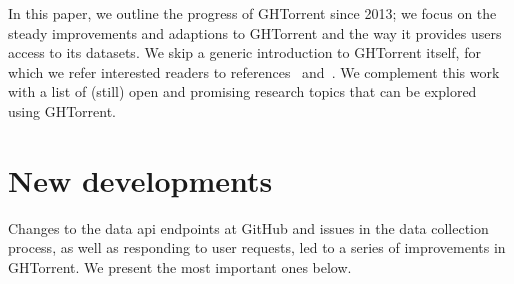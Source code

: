 \documentclass{sig-alternate}
\begin{document}
In this paper, we outline the progress of GHTorrent since 2013; we focus on the
steady improvements and adaptions to GHTorrent and the way it provides users
access to its datasets. We skip a generic introduction to GHTorrent itself, for
which we refer interested readers to references~\cite{GS12} and~\cite{Gousi13}.
We complement this work with a list of (still) open and promising research
topics that can be explored using GHTorrent.

\section{New developments}

Changes to the data {\sc api} endpoints at GitHub and issues in the data
collection process, as well as responding to user requests, led to a series of
improvements in GHTorrent. We present the most important ones below.
\end{document}
